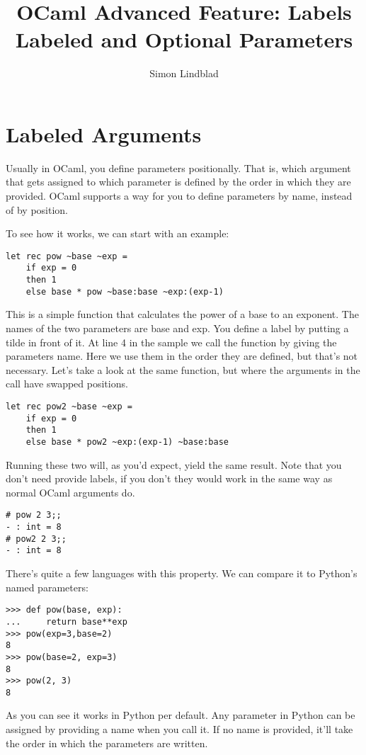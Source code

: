 \documentclass{article}
\author{Simon Lindblad}
\title{OCaml Advanced Feature: Labels \\
      \large Labeled and Optional Parameters}
\begin{document}
\maketitle
\section{Labeled Arguments}
Usually in OCaml, you define parameters positionally.
That is, which argument that gets assigned to which parameter is defined by the order in which they are provided.
OCaml supports a way for you to define parameters by name, instead of by position.

To see how it works, we can start with an example:
\begin{verbatim}
let rec pow ~base ~exp =
    if exp = 0
    then 1
    else base * pow ~base:base ~exp:(exp-1)
\end{verbatim}

This is a simple function that calculates the power of a base to an exponent.
The names of the two parameters are base and exp.
You define a label by putting a tilde in front of it.
At line 4 in the sample we call the function by giving the parameters name.
Here we use them in the order they are defined, but that's not necessary.
Let's take a look at the same function, but where the arguments in the call have swapped positions.

\begin{verbatim}
let rec pow2 ~base ~exp =
    if exp = 0
    then 1
    else base * pow2 ~exp:(exp-1) ~base:base
\end{verbatim}

Running these two will, as you'd expect, yield the same result.
Note that you don't need provide labels, if you don't they would work in the same way as normal OCaml arguments do.

\begin{verbatim}
# pow 2 3;;
- : int = 8
# pow2 2 3;;
- : int = 8
\end{verbatim}

There's quite a few languages with this property.
We can compare it to Python's named parameters:

\begin{verbatim}
>>> def pow(base, exp):
...     return base**exp
>>> pow(exp=3,base=2)
8
>>> pow(base=2, exp=3)
8
>>> pow(2, 3)
8
\end{verbatim}

As you can see it works in Python per default.
Any parameter in Python can be assigned by providing a name when you call it.
If no name is provided, it'll take the order in which the parameters are written.
\end{document}
